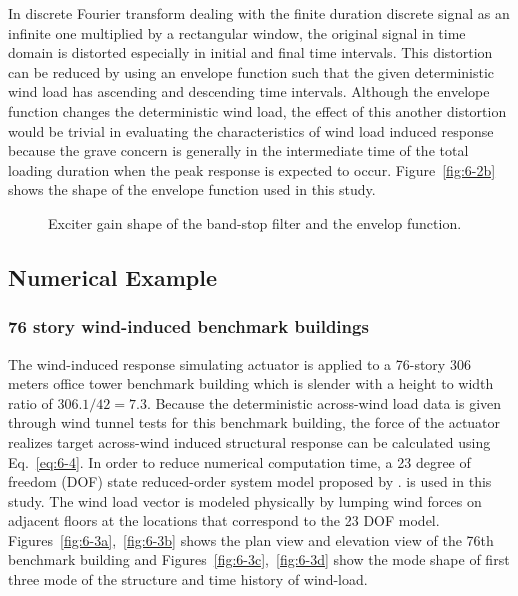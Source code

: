 In discrete Fourier transform dealing with the finite duration discrete signal as an infinite one multiplied by a rectangular window, the original signal in time domain is distorted especially in initial and final time intervals. This distortion can be reduced by using an envelope function such that the given deterministic wind load has ascending and descending time intervals. Although the envelope function changes the deterministic wind load, the effect of this another distortion would be trivial in evaluating the characteristics of wind load induced response because the grave concern is generally in the intermediate time of the total loading duration when the peak response is expected to occur. Figure~\ref{fig:6-2b} shows the shape of the envelope function used in this study.

\begin{figure}[!ht]
\centering
{}
\caption{Exciter gain shape of the band-stop filter and the envelop function.}
\label{fig:6-2}
\end{figure}

\subsection{Numerical Example}
\subsubsection{76 story wind-induced benchmark buildings}

The wind-induced response simulating actuator is applied to a 76-story 306 meters office tower benchmark building which is slender with a height to width ratio of $306.1/42= 7.3$. Because the deterministic across-wind load data is given through wind tunnel tests for this benchmark building, the force of the actuator realizes target across-wind induced structural response can be calculated using Eq.~\eqref{eq:6-4}. In order to reduce numerical computation time, a 23 degree of freedom (DOF) state reduced-order system model proposed by \citet{yang2004benchmark}. is used in this study. The wind load vector is modeled physically by lumping wind forces on adjacent floors at the locations that correspond to the 23 DOF model. Figures~\ref{fig:6-3a},~\ref{fig:6-3b} shows the plan view and elevation view of the 76th benchmark building and Figures~\ref{fig:6-3c},~\ref{fig:6-3d} show the mode shape of first three mode of the structure and time history of wind-load.

